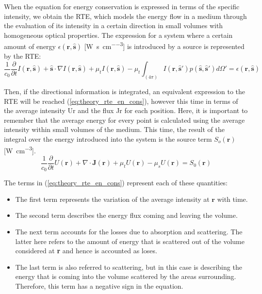 When the equation for energy conservation is expressed in terms of the specific intensity, we obtain the RTE, which models the energy flow in a medium through the evaluation of its intensity in a certain direction in small volumes with homogeneous optical properties. The expression for a system where a certain amount of energy $\epsilon(\mathbf{r},\mathbf{\hat{s}})$ [\si[per-mode=reciprocal]{\watt\per\second\per\cm\cubed}] is introduced by a source is represented by the RTE: 
\begin{equation}
\frac{1}{c_0}\frac{\partial}{\partial t}I(\mathbf{r},\mathbf{\hat{s}})+
\mathbf{\hat{s}}\cdot\nabla I(\mathbf{r},\mathbf{\hat{s}})+
\mu_tI(\mathbf{r},\mathbf{\hat{s}})-\mu_t\int_{(4\pi)}I(\mathbf{r},\mathbf{\hat{s}'})p(\mathbf{\hat{s}},\mathbf{\hat{s}}')d\Omega'=
\epsilon(\mathbf{r},\mathbf{\hat{s}})
\label{eq:theory_rte}
\end{equation}

Then, if the directional information is integrated, an equivalent expression to the RTE will be reached (\ref{eq:theory_rte_en_cons}), however this time in terms of the average intensity \gls{Ur} and the flux \gls{Jr} for each position. Here, it is important to remember that the average energy for every point is calculated using the average intensity within small volumes of the medium. This time, the result of the integral over the energy introduced into the system is the source term $S_o\left(\mathbf{r}\right)$ [\si[per-mode=reciprocal]{\watt\per\centi\metre\cubed}].
\begin{equation}
\frac{1}{c_0}\frac{\partial}{\partial t}U(\mathbf{r})+
\nabla\cdot\mathbf{J}(\mathbf{r})+
\mu_tU(\mathbf{r})-
\mu_sU(\mathbf{r})=
S_0(\mathbf{r})
\label{eq:theory_rte_en_cons}
\end{equation}

The terms in (\ref{eq:theory_rte_en_cons}) represent each of these quantities:

\begin{itemize}
\item The first term represents the variation of the average intensity at $\mathbf{r}$ with time. 
\item The second term describes the energy flux coming and leaving the volume.
\item The next term accounts for the losses due to absorption and scattering. The latter here refers to the amount of energy that is scattered out of the volume considered at \textbf{r} and hence is accounted as loses.
\item The last term is also referred to scattering, but in this case is describing the energy that is coming into the volume scattered by the areas surrounding. Therefore, this term has a negative sign in the equation.
\end{itemize}

